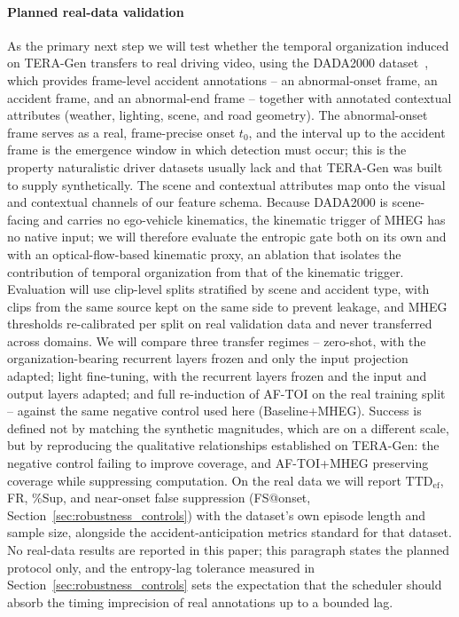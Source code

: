 \documentclass[a4paper,fleqn]{cas-dc}
\newcommand{\TERAGen}{\mbox{TERA-Gen}\xspace}
\newcommand{\AFTOI}{\mbox{AF-TOI}\xspace}
\newcommand{\MHEG}{\mbox{MHEG}\xspace}
\begin{document}
\paragraph{Planned real-data validation}
As the primary next step we will test whether the temporal organization induced
on \TERAGen transfers to real driving video, using the
DADA2000 dataset~\cite{fang2022dada}, which provides frame-level accident
annotations -- an abnormal-onset frame, an accident frame, and an abnormal-end
frame -- together with annotated contextual attributes (weather, lighting, scene,
and road geometry). The abnormal-onset frame serves as a real, frame-precise
onset $t_0$, and the interval up to the accident frame is the emergence window in
which detection must occur; this is the property naturalistic driver datasets
usually lack and that \TERAGen was built to supply synthetically. The scene and
contextual attributes map onto the visual and contextual channels of our feature
schema. Because DADA2000 is scene-facing and carries no ego-vehicle kinematics,
the kinematic trigger of \MHEG has no native input; we will therefore evaluate the
entropic gate both on its own and with an optical-flow-based kinematic proxy, an
ablation that isolates the contribution of temporal organization from that of the
kinematic trigger. Evaluation will use clip-level splits stratified by scene and
accident type, with clips from the same source kept on the same side to prevent
leakage, and \MHEG thresholds re-calibrated per split on real validation data and
never transferred across domains. We will compare three transfer regimes --
zero-shot, with the organization-bearing recurrent layers frozen and only the
input projection adapted; light fine-tuning, with the recurrent layers frozen and
the input and output layers adapted; and full re-induction of \AFTOI on the real
training split -- against the same negative control used here (Baseline+MHEG).
Success is defined not by matching the synthetic magnitudes, which are on a
different scale, but by reproducing the qualitative relationships established on
\TERAGen: the negative control failing to improve coverage, and \mbox{AF-TOI}+MHEG
preserving coverage while suppressing computation. On the real data we will report
$\mathrm{TTD}_{\mathrm{ef}}$, FR, \%Sup, and near-onset false suppression
(FS@onset, Section~\ref{sec:robustness_controls}) with the dataset's own episode
length and sample size, alongside the accident-anticipation metrics standard for
that dataset. No real-data results are reported in this paper; this paragraph
states the planned protocol only, and the entropy-lag tolerance measured in
Section~\ref{sec:robustness_controls} sets the expectation that the scheduler
should absorb the timing imprecision of real annotations up to a bounded lag.
\end{document}
